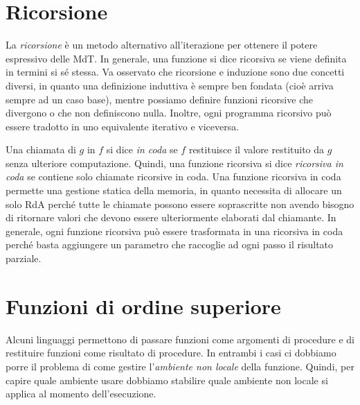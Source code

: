 \documentclass[a4paper,oneside,titlepage]{book}
\begin{document}
\section{Ricorsione}
La \textit{ricorsione} è un metodo alternativo all'iterazione per ottenere il potere espressivo delle MdT. In generale, una funzione si dice ricorsiva se viene definita in termini si sé stessa. Va osservato che ricorsione e induzione sono due concetti diversi, in quanto una definizione induttiva è sempre ben fondata (cioè arriva sempre ad un caso base), mentre possiamo definire funzioni ricorsive che divergono o che non definiscono nulla. Inoltre, ogni programma ricorsivo può essere tradotto in uno equivalente iterativo e viceversa.

Una chiamata di $g$ in $f$ si dice \textit{in coda} se $f$ restituisce il valore restituito da $g$ senza ulteriore computazione. Quindi, una funzione ricorsiva si dice \textit{ricorsiva in coda} se contiene solo chiamate ricorsive in coda. Una funzione ricorsiva in coda permette una gestione statica della memoria, in quanto necessita di allocare un solo RdA perché tutte le chiamate possono essere soprascritte non avendo bisogno di ritornare valori che devono essere ulteriormente elaborati dal chiamante. In generale, ogni funzione ricorsiva può essere trasformata in una ricorsiva in coda perché basta aggiungere un parametro che raccoglie ad ogni passo il risultato parziale.

\section{Funzioni di ordine superiore}
Alcuni linguaggi permettono di passare funzioni come argomenti di procedure e di restituire funzioni come risultato di procedure. In entrambi i casi ci dobbiamo porre il problema di come gestire l'\textit{ambiente non locale} della funzione. Quindi, per capire quale ambiente usare dobbiamo stabilire quale ambiente non locale si applica al momento dell'esecuzione.
\end{document}
